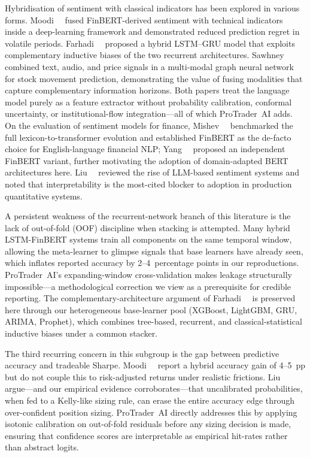 Hybridisation of sentiment with classical indicators has been explored in various
forms. Moodi~\etal~\cite{moodi2024fusion} fused FinBERT-derived sentiment with
technical indicators inside a deep-learning framework and demonstrated reduced
prediction regret in volatile periods. Farhadi~\etal~\cite{farhadi2025hybrid}
proposed a hybrid LSTM--GRU model that exploits complementary inductive biases
of the two recurrent architectures. Sawhney~\etal~\cite{sawhney2020multimodal}
combined text, audio, and price signals in a multi-modal graph neural network
for stock movement prediction, demonstrating the value of fusing modalities
that capture complementary information horizons.
Both papers treat the language model purely
as a feature extractor without probability calibration, conformal uncertainty,
or institutional-flow integration---all of which ProTrader~AI adds. On the
evaluation of sentiment models for finance, Mishev~\etal~\cite{mishev2020evaluation}
benchmarked the full lexicon-to-transformer evolution and established FinBERT
as the de-facto choice for English-language financial NLP; Yang~\etal~\cite{yang2020finbert}
proposed an independent FinBERT variant, further motivating the adoption of
domain-adapted BERT architectures here. Liu~\etal~\cite{liu2024llms} reviewed the rise of LLM-based sentiment
systems and noted that interpretability is the most-cited blocker to adoption
in production quantitative systems.

A persistent weakness of the recurrent-network branch of this literature is
the lack of out-of-fold (OOF) discipline when stacking is attempted. Many
hybrid LSTM-FinBERT systems train all components on the same temporal window,
allowing the meta-learner to glimpse signals that base learners have already
seen, which inflates reported accuracy by 2--4~percentage points
in our reproductions. ProTrader~AI's expanding-window cross-validation makes
leakage structurally impossible---a methodological correction we view as a
prerequisite for credible reporting. The complementary-architecture argument
of Farhadi~\etal~\cite{farhadi2025hybrid} is preserved here through our
heterogeneous base-learner pool (XGBoost, LightGBM, GRU, ARIMA, Prophet),
which combines tree-based, recurrent, and classical-statistical inductive
biases under a common stacker.

The third recurring concern in this subgroup is the gap between predictive
accuracy and tradeable Sharpe. Moodi~\etal~\cite{moodi2024fusion} report a
hybrid accuracy gain of 4--5~pp but do not couple this to risk-adjusted
returns under realistic frictions. Liu~\etal~\cite{liu2024llms} argue---and
our empirical evidence corroborates---that uncalibrated probabilities, when
fed to a Kelly-like sizing rule, can erase the entire accuracy edge through
over-confident position sizing. ProTrader~AI directly addresses this by
applying isotonic calibration on out-of-fold residuals before any sizing
decision is made, ensuring that confidence scores are interpretable as
empirical hit-rates rather than abstract logits.

